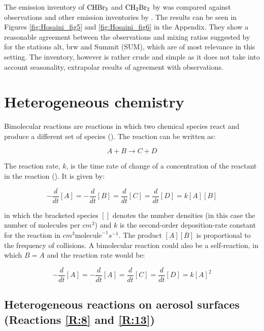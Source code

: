 The emission inventory of $\mathrm{CHBr_3}$ and $\mathrm{CH_2Br_2}$ by \cite{Liang2010} was compared against observations and other emission inventories by \cite{Hossaini2013}. The results can be seen in Figures \ref{fig:Hosaini_fig5} and \ref{fig:Hosaini_fig6} in the Appendix. They show a reasonable agreement between the observations and mixing ratios suggested by \cite{Liang2010} for the stations \acrfull{alt}, \acrfull{brw} and Summit (SUM), which are of most relevance in this setting. The inventory, however is rather crude and simple as it does not take into account seasonality, extrapolar results of agreement with observations. 






\section{Heterogeneous chemistry}\label{sec:het_chem}

Bimolecular reactions are reactions in which two chemical species react and produce a different set of species (\cite{Jacob1999}). The reaction can be written as: 

\begin{equation*}
    A + B \rightarrow C + D
\end{equation*}

The reaction rate, $k$, is the time rate of change of a concentration of the reactant in the reaction (\cite{AtmModFund}). It is given by: 

\begin{equation*}
    -\frac{d}{dt}[A] = -\frac{d}{dt}[B] = \frac{d}{dt}[C] = \frac{d}{dt}[D] = k[A][B]
\end{equation*}

in which the bracketed species $[]$ denotes the number densities (in this case the number of molecules per $cm^3$) and $k$ is the second-order deposition-rate constant for the reaction in $cm^3\text{molecule}^{-1}s^{-1}$. The product $[A][B]$ is proportional to the frequency of collisions. A bimolecular reaction could also be a self-reaction, in which $B = A$ and the reaction rate would be:

\begin{equation*}
    -\frac{d}{dt}[A] = -\frac{d}{dt}[A] = \frac{d}{dt}[C] = \frac{d}{dt}[D] = k[A]^2
\end{equation*}

\subsection{Heterogeneous reactions on aerosol surfaces (Reactions \ref{R:8} and \ref{R:13})}\label{sec:aerosol_react}

